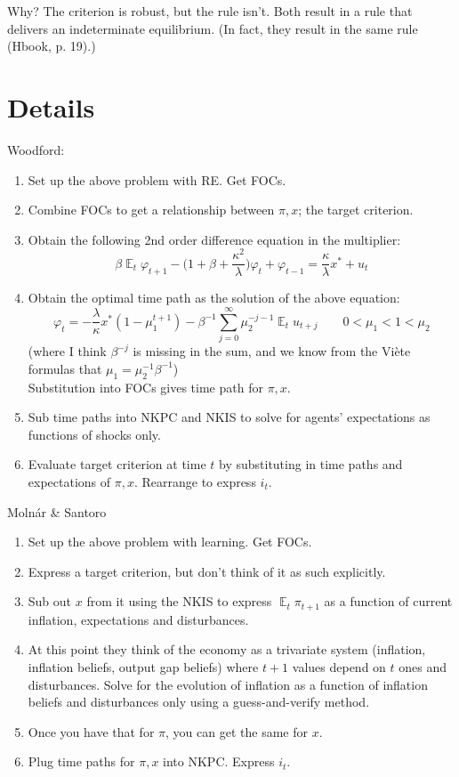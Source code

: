 \documentclass[11pt]{article}
\renewcommand{\[}{\begin{equation}}
\renewcommand{\]}{\end{equation}}
\DeclareMathOperator{\E}{\mathbb{E}}
\begin{document}
Why? The criterion is robust, but the rule isn't. Both result in a rule that delivers an indeterminate equilibrium. (In fact, they result in the same rule (Hbook, p. 19).)

\section{Details}
Woodford: 
\begin{enumerate}
\item Set up the above problem with RE. Get FOCs.
\item Combine FOCs to get a relationship between $\pi, x$; the target criterion.
\item Obtain the following 2nd order difference equation in the multiplier:
\begin{equation}
\beta \E_t\varphi_{t+1} - \big(1+\beta+\frac{\kappa^2}{\lambda}\big)\varphi_t + \varphi_{t-1} = \frac{\kappa}{\lambda} x^* + u_t
\end{equation}
\item Obtain the optimal time path as the solution of the above equation:
\begin{equation}
\varphi_t = -\frac{\lambda}{\kappa}x^*(1-\mu_1^{t+1}) -\beta^{-1}\sum_{j=0}^{\infty}\mu_2^{-j-1}\E_t u_{t+j} \quad \quad 0 < \mu_1 < 1 < \mu_2
\end{equation}
(where I think $\beta^{-j}$ is missing in the sum, and we know from the Vi\`ete formulas that $\mu_1 = \mu_2^{-1}\beta^{-1}$) \\
Substitution into FOCs gives time path for $\pi,x$.
\item Sub time paths into NKPC and NKIS to solve for agents' expectations as functions of shocks only.
\item Evaluate target criterion at time $t$ by substituting in time paths and expectations of $\pi,x$. Rearrange to express $i_t$.
\end{enumerate}


\noindent Moln\'ar \& Santoro
\begin{enumerate}
\item Set up the above problem with learning. Get FOCs. 
\item Express a target criterion, but don't think of it as such explicitly.
\item Sub out $x$ from it using the NKIS to express $\E_t \pi_{t+1}$ as a function of current inflation, expectations and disturbances. 
\item At this point they think of the economy as a trivariate system (inflation, inflation beliefs, output gap beliefs) where $t+1$ values depend on $t$ ones and disturbances. Solve for the evolution of inflation as a function of inflation beliefs and disturbances only using a guess-and-verify method.
\item Once you have that for $\pi$, you can get the same for $x$.
\item Plug time paths for $\pi,x$ into NKPC. Express $i_t$.
\end{enumerate}
\end{document}
